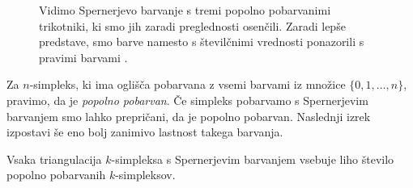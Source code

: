 \documentclass[mat1]{fmfdelo}
\newcommand{\0}{\underline{0}}
\begin{document}
\begin{figure}[h!]
	\caption{Vidimo Spernerjevo barvanje s tremi popolno pobarvanimi trikotniki, ki smo jih zaradi preglednosti osenčili. Zaradi lepše predstave, smo barve namesto s številčnimi vrednosti ponazorili s pravimi barvami .}
\end{figure}
Za $n$-simpleks, ki ima oglišča pobarvana z vsemi barvami iz množice $\{ 0, 1, \dots, n \}$, pravimo, da je \emph{popolno pobarvan}. Če simpleks pobarvamo s Spernerjevim barvanjem smo lahko prepričani, da je popolno pobarvan. Naslednji izrek izpostavi še eno bolj zanimivo lastnost takega barvanja.
\begin{lema}\label{izr:sperner}
Vsaka triangulacija $k$-simpleksa s Spernerjevim barvanjem vsebuje liho število popolno pobarvanih $k$-simpleksov.
\end{lema}
\end{document}
